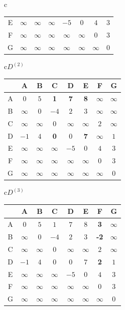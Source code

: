 \begin{pastsoln}
\begin{center}
\begin{tabular}[t]{c}
\begin{tabular}{c|*{7}{c}}
E & $\infty$ & $\infty$ & $\infty$ & $-5$ & $0$ & $4$ & $3$ \\
F & $\infty$ & $\infty$ & $\infty$ & $\infty$ & $\infty$ & $0$ & $3$ \\
G & $\infty$ & $\infty$ & $\infty$ & $\infty$ & $\infty$ & $\infty$ & $0$ \\
\end{tabular}
\end{tabular}
\end{center}
\begin{center}\small
\begin{tabular}[t]{c}$D^{(2)}$\\[2pt]
\begin{tabular}{c|*{7}{c}}
 & A & B & C & D & E & F & G \\ \hline
A & $0$ & $5$ & \textbf{1} & \textbf{7} & \textbf{8} & $\infty$ & $\infty$ \\
B & $\infty$ & $0$ & $-4$ & $2$ & $3$ & $\infty$ & $\infty$ \\
C & $\infty$ & $\infty$ & $0$ & $\infty$ & $\infty$ & $2$ & $\infty$ \\
D & $-1$ & $4$ & \textbf{0} & $0$ & \textbf{7} & $\infty$ & $1$ \\
E & $\infty$ & $\infty$ & $\infty$ & $-5$ & $0$ & $4$ & $3$ \\
F & $\infty$ & $\infty$ & $\infty$ & $\infty$ & $\infty$ & $0$ & $3$ \\
G & $\infty$ & $\infty$ & $\infty$ & $\infty$ & $\infty$ & $\infty$ & $0$ \\
\end{tabular}
\end{tabular}\qquad
\begin{tabular}[t]{c}$D^{(3)}$\\[2pt]
\begin{tabular}{c|*{7}{c}}
 & A & B & C & D & E & F & G \\ \hline
A & $0$ & $5$ & $1$ & $7$ & $8$ & \textbf{3} & $\infty$ \\
B & $\infty$ & $0$ & $-4$ & $2$ & $3$ & \textbf{-2} & $\infty$ \\
C & $\infty$ & $\infty$ & $0$ & $\infty$ & $\infty$ & $2$ & $\infty$ \\
D & $-1$ & $4$ & $0$ & $0$ & $7$ & \textbf{2} & $1$ \\
E & $\infty$ & $\infty$ & $\infty$ & $-5$ & $0$ & $4$ & $3$ \\
F & $\infty$ & $\infty$ & $\infty$ & $\infty$ & $\infty$ & $0$ & $3$ \\
G & $\infty$ & $\infty$ & $\infty$ & $\infty$ & $\infty$ & $\infty$ & $0$ \\

\end{tabular}
\end{tabular}
\end{center}
\end{pastsoln}
